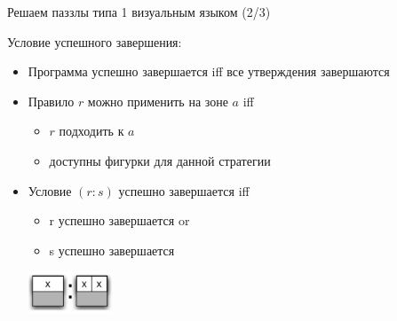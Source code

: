 \documentclass[aspectratio=169
  , xcolor={svgnames}
  , hyperref={ colorlinks,citecolor=DeepPink4
             , linkcolor=DarkRed,urlcolor=DarkBlue}
  , russian
  ]{beamer}
\theoremstyle{exerciseStyle1}
\begin{document}
\begin{frame}[fragile]{Решаем паззлы типа 1 визуальным языком (2/3)}
\begin{minipage}{.48\textwidth}
Условие успешного завершения:
\begin{itemize}
\item Программа успешно завершается iff все утверждения завершаются
\item Правило $r$ можно применить на зоне $a$ iff
\begin{itemize}
\item  $r$ подходить к $a$
\item  доступны фигурки для данной стратегии 
\end{itemize}
\item Условие $(r:s)$ успешно завершается iff
\begin{itemize}
\item r успешно завершается or
\item s успешно завершается
\end{itemize}
\begin{center}
\includegraphics[width=2.5cm]{figures/someurule1}
\end{center}
\end{itemize}
\end{minipage}
\end{frame}
\end{document}

